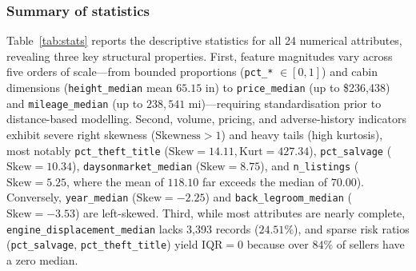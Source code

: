 \subsubsection{Summary of statistics}
Table~\ref{tab:stats} reports the descriptive statistics for all 24 numerical attributes, revealing three key structural properties. First, feature magnitudes vary across five orders of scale---from bounded proportions (\texttt{pct\_*} $\in [0, 1]$) and cabin dimensions (\texttt{height\_median} mean $65.15\text{ in}$) to \texttt{price\_median} (up to \$236,438) and \texttt{mileage\_median} (up to $238,541\text{ mi}$)---requiring standardisation prior to distance-based modelling. Second, volume, pricing, and adverse-history indicators exhibit severe right skewness ($\text{Skewness} > 1$) and heavy tails (high kurtosis), most notably \texttt{pct\_theft\_title} ($\text{Skew} = 14.11, \text{Kurt} = 427.34$), \texttt{pct\_salvage} ($\text{Skew} = 10.34$), \texttt{daysonmarket\_median} ($\text{Skew} = 8.75$), and \texttt{n\_listings} ($\text{Skew} = 5.25$, where the mean of $118.10$ far exceeds the median of $70.00$). Conversely, \texttt{year\_median} ($\text{Skew} = -2.25$) and \texttt{back\_legroom\_median} ($\text{Skew} = -3.53$) are left-skewed. Third, while most attributes are nearly complete, \texttt{engine\_displacement\_median} lacks 3,393 records ($24.51\%$), and sparse risk ratios (\texttt{pct\_salvage}, \texttt{pct\_theft\_title}) yield $\text{IQR} = 0$ because over $84\%$ of sellers have a zero median.

